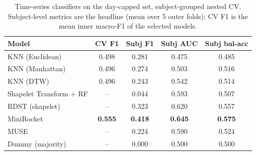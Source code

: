 \begin{table}[H]
\centering
\small
\caption{Time-series classifiers on the day-capped set, subject-grouped nested CV. Subject-level metrics are the headline (mean over 5 outer folds); CV F1 is the mean inner macro-F1 of the selected models.}
\label{tab:ts_clf}
\begin{tabular}{l c c c c}
\hline
Model & CV F1 & Subj F1 & Subj AUC & Subj bal-acc \\
\hline
KNN (Euclidean) & 0.498 & 0.281 & 0.475 & 0.485 \\
KNN (Manhattan) & 0.496 & 0.274 & 0.503 & 0.516 \\
KNN (DTW) & 0.496 & 0.243 & 0.542 & 0.514 \\
Shapelet Transform + RF & -- & 0.044 & 0.593 & 0.507 \\
RDST (shapelet) & -- & 0.323 & 0.620 & 0.557 \\
MiniRocket & \textbf{0.555} & \textbf{0.418} & \textbf{0.645} & \textbf{0.575} \\
MUSE & -- & 0.224 & 0.590 & 0.524 \\
Dummy (majority) & -- & 0.000 & 0.500 & 0.500 \\
\hline
\end{tabular}
\end{table}